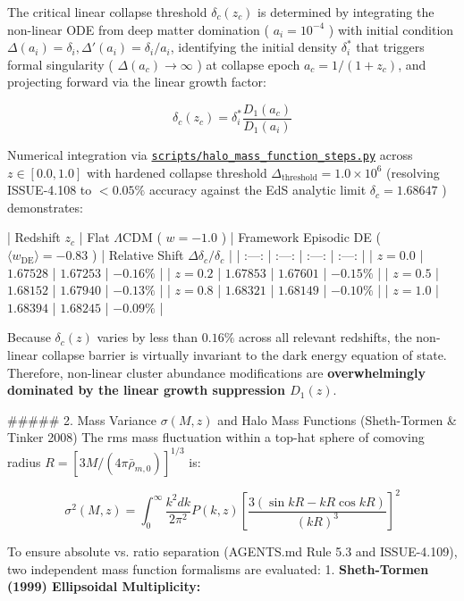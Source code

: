 \documentclass[11pt,a4paper]{article}
\theoremstyle{definition}
\theoremstyle{remark}
\begin{document}
The critical linear collapse threshold $\delta_c(z_c)$ is determined by integrating the non-linear ODE from deep matter domination ( $a_i = 10^{-4}$ ) with initial condition $\Delta(a_i) = \delta_i, \Delta'(a_i) = \delta_i / a_i$, identifying the initial density $\delta_i^*$ that triggers formal singularity ( $\Delta(a_c) \to \infty$ ) at collapse epoch $a_c = 1/(1+z_c)$, and projecting forward via the linear growth factor:


\begin{equation}
\delta_c(z_c) = \delta_i^* \frac{D_1(a_c)}{D_1(a_i)}
\end{equation}


Numerical integration via \href{../../scripts/halo_mass_function_steps.py}{\texttt{scripts/halo_mass_function_steps.py}} across $z \in [0.0, 1.0]$ with hardened collapse threshold $\Delta_{\text{threshold}} = 1.0 \times 10^6$ (resolving ISSUE-4.108 to $< 0.05\%$ accuracy against the EdS analytic limit $\delta_c = 1.68647$ ) demonstrates:

| Redshift $z_c$ | Flat $\Lambda\text{CDM}$ ( $w = -1.0$ ) | Framework Episodic DE ( $\langle w_{\text{DE}} \rangle = -0.83$ ) | Relative Shift $\Delta\delta_c / \delta_c$ |
| :---: | :---: | :---: | :---: |
| $z = 0.0$ | $1.67528$ | $1.67253$ | $-0.16\%$ |
| $z = 0.2$ | $1.67853$ | $1.67601$ | $-0.15\%$ |
| $z = 0.5$ | $1.68152$ | $1.67940$ | $-0.13\%$ |
| $z = 0.8$ | $1.68321$ | $1.68149$ | $-0.10\%$ |
| $z = 1.0$ | $1.68394$ | $1.68245$ | $-0.09\%$ |

Because $\delta_c(z)$ varies by less than $0.16\%$ across all relevant redshifts, the non-linear collapse barrier is virtually invariant to the dark energy equation of state. Therefore, non-linear cluster abundance modifications are \textbf{overwhelmingly dominated by the linear growth suppression $D_1(z)$}.

\#\#\#\#\# 2. Mass Variance $\sigma(M, z)$ and Halo Mass Functions (Sheth-Tormen \& Tinker 2008)
The rms mass fluctuation within a top-hat sphere of comoving radius $R = [3M / (4\pi \bar{\rho}_{m,0})]^{1/3}$ is:


\begin{equation}
\sigma^2(M, z) = \int_0^\infty \frac{k^2 dk}{2\pi^2} P(k, z) \left[ \frac{3(\sin kR - kR \cos kR)}{(kR)^3} \right]^2
\end{equation}


To ensure absolute vs. ratio separation (AGENTS.md Rule 5.3 and ISSUE-4.109), two independent mass function formalisms are evaluated:
1. \textbf{Sheth-Tormen (1999) Ellipsoidal Multiplicity:}
\end{document}
